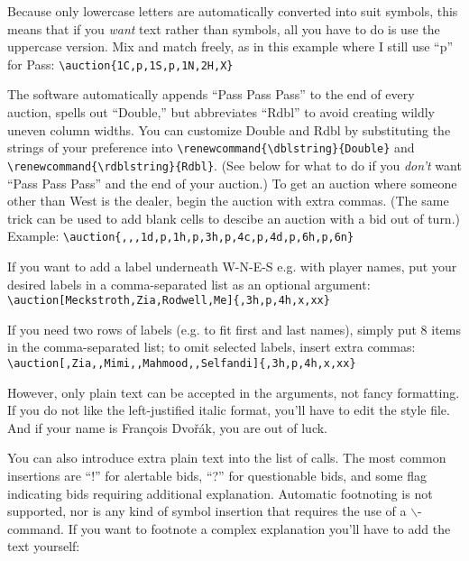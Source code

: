 \documentclass[10pt]{article}%
\newcommand{\gap}{\vspace{\baselineskip}}
\begin{document}
\gap{}\gap

Because only lowercase letters are automatically converted into suit symbols, this means that if you \textit{want} text rather than symbols, all you have to do is use the uppercase version. Mix and match freely, as in this example where I still use ``p'' for Pass: \verb+\auction{1C,p,1S,p,1N,2H,X}+

 \gap{}\gap
 
The software automatically appends ``Pass Pass Pass'' to the end of every auction, spells out ``Double,'' but abbreviates ``Rdbl'' to avoid creating wildly uneven column widths. You can customize Double and Rdbl by substituting the strings of your preference into \verb+\renewcommand{\dblstring}{Double}+ and \verb+\renewcommand{\rdblstring}{Rdbl}+. (See below for what to do if you \textit{don't} want ``Pass Pass Pass'' and the end of your auction.) 
To get an auction where someone other than West is the dealer, begin the auction with extra commas. (The same trick can be used to add blank cells to descibe an auction with a bid out of turn.) Example: \verb+\auction{,,,1d,p,1h,p,3h,p,4c,p,4d,p,6h,p,6n}+

\gap{}\gap

If you want to add a label underneath W-N-E-S e.g. with player names, put your desired labels in a comma-separated list as an optional argument: 
\verb+\auction[Meckstroth,Zia,Rodwell,Me]{,3h,p,4h,x,xx}+

\gap{}\gap

If you need two rows of labels (e.g. to fit first and last names), simply put 8 items in the comma-separated list; to omit selected labels, insert extra commas:\\  \verb+\auction[,Zia,,Mimi,,Mahmood,,Selfandi]{,3h,p,4h,x,xx}+

\gap{}\gap

However, only plain text can be accepted in the arguments, not fancy formatting. If you do not like the left-justified italic format, you'll have to edit the style file. And if your name is Fran\c{c}ois Dvo\v{r}\'ak, you are out of luck.

You can also introduce extra plain text into the list of calls. The most common insertions are ``!'' for alertable bids, ``?'' for questionable bids, and some flag indicating bids requiring additional explanation. Automatic footnoting is not supported, nor is any kind of symbol insertion that requires the use of a $\backslash$-command. If you want to footnote a complex explanation you'll have to add the text yourself:
\end{document}
